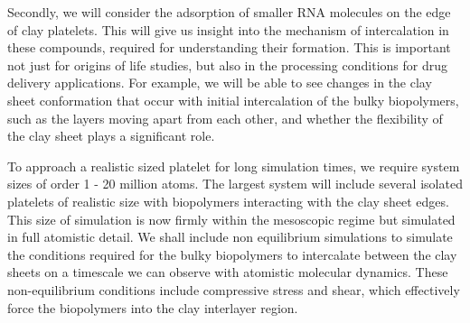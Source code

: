 %
Secondly, we will consider the adsorption of smaller RNA molecules on the edge of clay platelets. 
This will give us insight into the mechanism of
intercalation in these compounds, required for understanding their formation. This is important not just for origins of life studies, but also in the processing conditions for drug delivery applications. For example, we will be able to see changes in the clay sheet conformation that occur with initial intercalation of the bulky biopolymers, such as the layers moving apart from each other, and whether the flexibility of the clay sheet plays a significant role. 

To approach a realistic sized platelet for long simulation times, we require system sizes 
of order 1 - 20 million atoms. The largest system will include several isolated platelets of 
realistic size with biopolymers interacting with the clay sheet edges. This size of simulation 
is now firmly within the mesoscopic regime but simulated in full atomistic detail. We shall 
include non equilibrium simulations to simulate the conditions required for the bulky biopolymers 
to intercalate between the clay sheets on a timescale we can observe with atomistic molecular 
dynamics. These non-equilibrium conditions include compressive stress and shear, which effectively 
force the biopolymers into the clay interlayer region.


